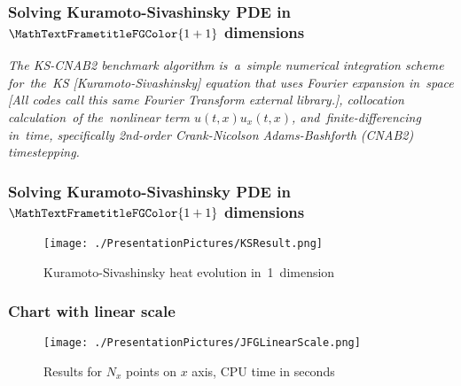 \documentclass[10pt,t]{beamer}
\begin{document}
\begin{frame}
  \frametitle{Solving Kuramoto-Sivashinsky PDE
    in~$\MathTextFrametitleFGColor{1 + 1}$ dimensions}


  \textit{The KS-CNAB2 benchmark algorithm is~a~simple numerical
    integration scheme for~the~KS [Kuramoto-Sivashinsky] equation that
    uses Fourier expansion in~space [All codes call this same Fourier
    Transform external library.], collocation calculation~of
    the~nonlinear term $u( t, x ) u_{ x }( t, x )$,
    and~finite-differencing in~time, specifically 2nd-order
    Crank-Nicolson Adams-Bashforth (CNAB2) timestepping.}


\end{frame}





\begin{frame}
  \frametitle{Solving Kuramoto-Sivashinsky PDE
    in~$\MathTextFrametitleFGColor{1 + 1}$ dimensions}


  \begin{figure}

    \centering

    \texttt{[image: ./PresentationPictures/KSResult.png]}


    \caption{Kuramoto-Sivashinsky heat evolution in~1~dimension}

  \end{figure}

\end{frame}





\begin{frame}
  \frametitle{Chart with linear scale}


  \begin{figure}

    \centering

    \texttt{[image: ./PresentationPictures/JFGLinearScale.png]}


    \caption{Results for $N_{ x }$ points on $x$ axis, CPU time in
      seconds}

  \end{figure}


\end{frame}
\end{document}
